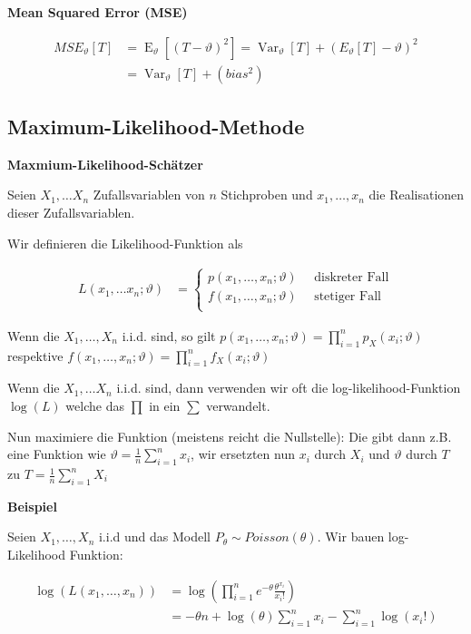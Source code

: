 \documentclass[25pt]{sciposter}
\newcommand{\Var}{\operatorname{Var}}
\newcommand{\E}{\operatorname{E}}
\newenvironment{method}[1]{\begin{mdframed}[backgroundcolor=blue!10,innertopmargin=15pt, innerbottommargin=15pt,nobreak=true]
		\textbf{#1 }
	}
	{ 
	\end{mdframed}
}
\begin{document}
\begin{multicols}{3}
\begin{method}{Mean Squared Error (MSE)}
\begin{align*}
	MSE_\vartheta[T] &= \E_\vartheta [(T-\vartheta)^2]= \Var_\vartheta[T] + (E_\vartheta [T]-\vartheta)^2\\
	&=  \Var_\vartheta[T] + (bias^2)
\end{align*}
\end{method}




\subsection*{Maximum-Likelihood-Methode}

\begin{method}{Maxmium-Likelihood-Schätzer}
Seien $X_1,\ldots X_n$ Zufallsvariablen von $n$ Stichproben und $x_1,\ldots,x_n$ die Realisationen dieser Zufallsvariablen.	
	
Wir definieren die Likelihood-Funktion als

\begin{align*}
	L(x_1,\ldots x_n;\vartheta) &= \begin{cases}
	p(x_1,\ldots,x_n;\vartheta) \quad \text{ diskreter Fall}\\
	f(x_1,\ldots,x_n;\vartheta) \quad \text{ stetiger Fall}\\
	\end{cases}
\end{align*}

Wenn die $X_1,\ldots,X_n$ i.i.d. sind, so gilt $p(x_1,\ldots,x_n;\vartheta) = \prod_{i=1}^{n}p_X(x_i;\vartheta)$ respektive $f(x_1,\ldots,x_n;\vartheta) = \prod_{i=1}^{n}f_X(x_i;\vartheta)$

Wenn die $X_1,\ldots X_n$ i.i.d. sind, dann verwenden wir oft die log-likelihood-Funktion $\log(L)$ welche das $\prod$ in ein $\sum$ verwandelt.

Nun maximiere die Funktion (meistens reicht die Nullstelle): Die gibt dann z.B. eine Funktion wie $\vartheta = \frac{1}{n}\sum_{i=1}^{n}x_i$, wir ersetzten nun $x_i$ durch $X_i$ und $\vartheta$ durch $T$ zu $T = \frac{1}{n}\sum_{i=1}^{n}X_i$
\end{method}

\textbf{Beispiel}

Seien $X_1,\ldots,X_n$ i.i.d und das Modell $P_{\theta}\sim Poisson(\theta)$. Wir bauen log-Likelihood Funktion:

\begin{align*}
	\log(L(x_1,\ldots,x_n)) &= \log\left(\prod_{i=1}^{n} e^{-\theta} \frac{\theta^{x_i}}{x_i !} \right)\\ &= -\theta n + \log(\theta) \sum_{i=1}^{n} x_i - \sum_{i=1}^{n}\log(x_i !)
\end{align*}


\end{multicols}
\end{document}
